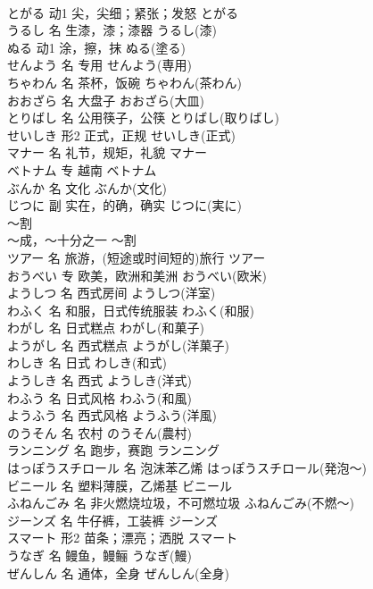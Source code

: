 \documentclass[8pt]{extreport}
\begin{document}
\begin{CJK}{UTF8}{min}
\\	とがる	动1	尖，尖细；紧张；发怒	とがる	
\\	うるし	名	生漆，漆；漆器	うるし(漆)	
\\	ぬる	动1	涂，擦，抹	ぬる(塗る)	
\\	せんよう	名	专用	せんよう(専用)	
\\	ちゃわん	名	茶杯，饭碗	ちゃわん(茶わん)	
\\	おおざら	名	大盘子	おおざら(大皿)	
\\	とりばし	名	公用筷子，公筷	とりばし(取りばし)	
\\	せいしき	形2	正式，正规	せいしき(正式)	
\\	マナー	名	礼节，规矩，礼貌	マナー	
\\	ベトナム	专	越南	ベトナム	
\\	ぶんか	名	文化	ぶんか(文化)	
\\	じつに	副	实在，的确，确实	じつに(実に)	
\\	～割	
\\	～成，～十分之一	～割	
\\	ツアー	名	旅游，(短途或时间短的)旅行	ツアー	
\\	おうべい	专	欧美，欧洲和美洲	おうべい(欧米)	
\\	ようしつ	名	西式房间	ようしつ(洋室)	
\\	わふく	名	和服，日式传统服装	わふく(和服)	
\\	わがし	名	日式糕点	わがし(和菓子)	
\\	ようがし	名	西式糕点	ようがし(洋菓子)	
\\	わしき	名	日式	わしき(和式)	
\\	ようしき	名	西式	ようしき(洋式)	
\\	わふう	名	日式风格	わふう(和風)	
\\	ようふう	名	西式风格	ようふう(洋風)	
\\	のうそん	名	农村	のうそん(農村)	
\\	ランニング	名	跑步，赛跑	ランニング	
\\	はっぽうスチロール	名	泡沫苯乙烯	はっぽうスチロール(発泡～)	
\\	ビニール	名	塑料薄膜，乙烯基	ビニール	
\\	ふねんごみ	名	非火燃烧垃圾，不可燃垃圾	ふねんごみ(不燃～)	
\\	ジーンズ	名	牛仔裤，工装裤	ジーンズ	
\\	スマート	形2	苗条；漂亮；洒脱	スマート	
\\	うなぎ	名	鳗鱼，鳗鲡	うなぎ(鰻)	
\\	ぜんしん	名	通体，全身	ぜんしん(全身)	

\end{CJK}
\end{document}
